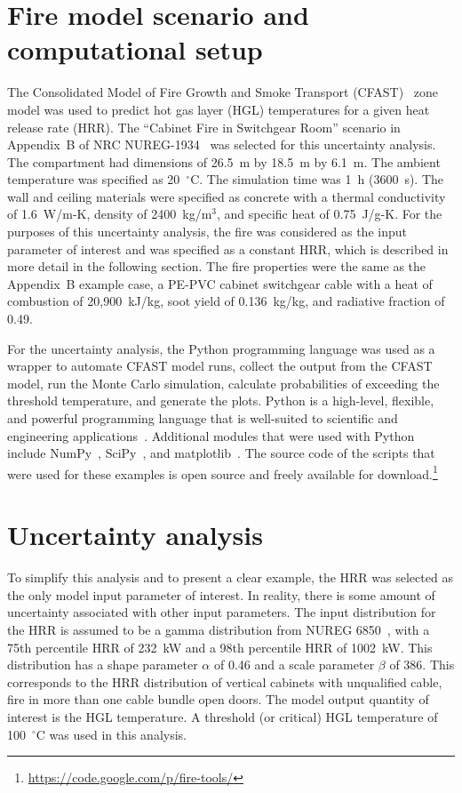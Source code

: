 \documentclass[12pt]{article}
\begin{document}




\section{Fire model scenario and computational setup}
\label{sec:fire_model_scenario_setup}

The Consolidated Model of Fire Growth and Smoke Transport (CFAST)~\cite{CFAST_Users_Guide_6} zone model was used to predict hot gas layer (HGL) temperatures for a given heat release rate (HRR). The ``Cabinet Fire in Switchgear Room'' scenario in Appendix~B of NRC NUREG-1934~\cite{NUREG_1934} was selected for this uncertainty analysis. The compartment had dimensions of 26.5~m by 18.5~m by 6.1~m. The ambient temperature was specified as 20~$^\circ$C. The simulation time was 1~h (3600~s). The wall and ceiling materials were specified as concrete with a thermal conductivity of 1.6~W/m-K, density of 2400~kg/m$^3$, and specific heat of 0.75~J/g-K. For the purposes of this uncertainty analysis, the fire was considered as the input parameter of interest and was specified as a constant HRR, which is described in more detail in the following section. The fire properties were the same as the Appendix~B example case, a PE-PVC cabinet switchgear cable with a heat of combustion of 20,900~kJ/kg, soot yield of 0.136~kg/kg, and radiative fraction of 0.49.

For the uncertainty analysis, the Python programming language was used as a wrapper to automate CFAST model runs, collect the output from the CFAST model, run the Monte Carlo simulation, calculate probabilities of exceeding the threshold temperature, and generate the plots. Python is a high-level, flexible, and powerful programming language that is well-suited to scientific and engineering applications~\cite{Oliphant:2007}. Additional modules that were used with Python include NumPy~\cite{oliphant2006guide}, SciPy~\cite{Jones:2001fk}, and matplotlib~\cite{Hunter:2007}. The source code of the scripts that were used for these examples is open source and freely available for download.\footnote{\url{https://code.google.com/p/fire-tools/}}


\section{Uncertainty analysis}
\label{sec:uncertainty_analysis}

 To simplify this analysis and to present a clear example, the HRR was selected as the only model input parameter of interest. In reality, there is some amount of uncertainty associated with other input parameters. The input distribution for the HRR is assumed to be a gamma distribution from NUREG 6850~\cite{NUREG_6850}, with a 75th percentile HRR of 232~kW and a 98th percentile HRR of 1002~kW. This distribution has a shape parameter $\alpha$ of 0.46 and a scale parameter $\beta$ of 386. This corresponds to the HRR distribution of vertical cabinets with unqualified cable, fire in more than one cable bundle open doors. The model output quantity of interest is the HGL temperature. A threshold (or critical) HGL temperature of 100~$^\circ$C was used in this analysis.
\end{document}
